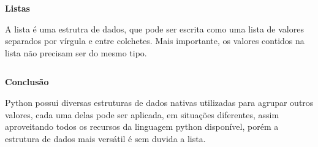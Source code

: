 \documentclass[12pt]{article}
\begin{document}
\begin{enumerate}
\textbf{Listas}

A lista é uma estrutra de dados, que pode ser escrita como uma lista de valores separados por vírgula e entre colchetes. Mais importante, os valores contidos na lista não precisam ser do mesmo tipo.

\inputminted{python}{Exemplo-7/Lista.py}

\textbf{Conclusão}

Python possui diversas estruturas de dados nativas utilizadas para agrupar outros valores, cada uma delas pode ser aplicada, em situações diferentes, 
assim aproveitando todos os recursos da linguagem python disponível, porém a estrutura de dados mais versátil é sem duvida a lista.




\end{enumerate}
\end{document}
